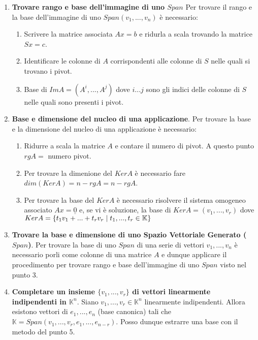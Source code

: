 \documentclass[12pt,a4paper,oneside]{book}
\begin{document}
\begin{enumerate}
\begin{enumerate}
	  \end{enumerate}
	
\item \textbf{Trovare rango e base dell'immagine di uno $Span$} \linebreak
	  Per trovare il rango e la base dell'immagine di uno $Span{(v_1, ..., v_n)}$ è necessario:
	  
	  \begin{enumerate}
	  \item Scrivere la matrice associata $Ax=b$ e ridurla a scala trovando la matrice $Sx=c$.
	  \item Identificare le colonne di $A$ corrispondenti alle colonne di $S$ nelle quali si trovano i 
	    	pivot.
	  \item Base di $ImA = (A^i, ..., A^j)$ dove $i...j$ sono gli indici delle colonne di $S$ nelle quali 
	    	sono presenti i pivot.
	  \end{enumerate}
	
\item \textbf{Base e dimensione del nucleo di una applicazione}. \linebreak
	  Per trovare la base e la dimensione del nucleo di una applicazione è necessario:
	  
	  \begin{enumerate}
	  \item Ridurre a scala la matrice $A$ e contare il numero di pivot. A questo punto $rgA =$ numero 
	  	  	pivot.
	  \item Per trovare la dimenione del $KerA$ è necessario fare $dim(KerA)=n-rgA=n-rgA$.
	  \item Per trovare la base del $KerA$ è necessario risolvere il sistema omogeneo associato $Ax=
	   		\underline{0}$ e, se vi è soluzione, la base di $KerA =(v_1, ..., v_r)$ dove $KerA=\{t_1v_1+...
	  		+t_rv_r \hspace{0.1cm} | \hspace{0.1cm} t_1, ..., t_r \in \mathbb{K}\}$
	  \end{enumerate}

\item \textbf{Trovare la base e dimensione di uno Spazio Vettoriale Generato ($Span$)}. \linebreak
	  Per trovare la base di uno $Span$ di una  serie di vettori $v_1, ..., v_n$ è necessario porli come 
	  colonne di una matrice $A$ e dunque applicare il procedimento per trovare rango e base dell'immagine
	  di uno $Span$ visto nel punto 3.
	
\item \textbf{Completare un insieme $\{v_1, ..., v_r\}$ di vettori linearmente indipendenti in $\mathbb{K}
			  ^n$}. \linebreak
	  Siano $v_1, ..., v_r \in \mathbb{K}^n$ linearmente indipendenti. Allora esistono vettori di $e_1, 
	  ..., e_n$ (base canonica) tali che $\mathbb{K} = Span(v_1, ..., v_r, e_1, ..., e_{n-r})$.\hfill 
	  \break Posso dunque estrarre una base con il metodo del punto 5.

\end{enumerate}
\end{document}
